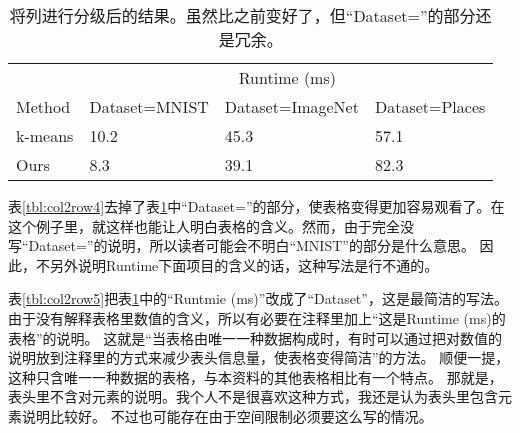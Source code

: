 \documentclass{article}
\newcommand{\Tref}[1]{表\ref{#1}}
\begin{document}
\begin{table}[h]
    \centering
    \begin{tabular}{@{}llll@{}} \toprule
                & \multicolumn{3}{c}{Runtime (ms)}  \\ \cmidrule(l){2-4}
        Method & Dataset=MNIST & Dataset=ImageNet & Dataset=Places \\ \midrule
        k-means   & 10.2 & 45.3 & 57.1 \\ 
        Ours      & 8.3  & 39.1 & 82.3 \\ \bottomrule   
    \end{tabular}
    \caption{将列进行分级后的结果。虽然比之前变好了，但“Dataset=”的部分还是冗余。}
    \label{tbl:col2row3}
\end{table}


\Tref{tbl:col2row4}去掉了\Tref{tbl:col2row3}中“Dataset=”的部分，使表格变得更加容易观看了。在这个例子里，就这样也能让人明白表格的含义。然而，由于完全没写“Dataset=”的说明，所以读者可能会不明白“MNIST”的部分是什么意思。
因此，不另外说明Runtime下面项目的含义的话，这种写法是行不通的。


\Tref{tbl:col2row5}把\Tref{tbl:col2row3}中的“Runtmie (ms)”改成了“Dataset”，这是最简洁的写法。由于没有解释表格里数值的含义，所以有必要在注释里加上“这是Runtime (ms)的表格”的说明。
这就是“当表格由唯一一种数据构成时，有时可以通过把对数值的说明放到注释里的方式来减少表头信息量，使表格变得简洁”的方法。
顺便一提，这种只含唯一一种数据的表格，与本资料的其他表格相比有一个特点。
那就是，表头里不含对元素的说明。我个人不是很喜欢这种方式，我还是认为表头里包含元素说明比较好。
不过也可能存在由于空间限制必须要这么写的情况。
\end{document}
